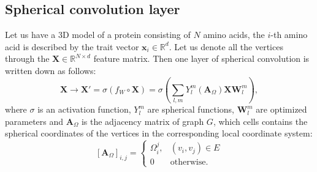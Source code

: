\documentclass[12pt,twoside]{article}
\begin{document}
	\subsection{Spherical convolution layer}
	Let us have a 3D model of a protein consisting of $N$ amino acids, the $i$-th amino acid is described by the trait vector $\boldsymbol{x}_i \in \mathbb{R}^d$.
	Let us denote all the vertices through the $\boldsymbol{X} \in \mathbb{R}^{N \times d}$ feature matrix. Then one layer of spherical
	convolution is written down as follows:
	$$
		\boldsymbol{X} \longrightarrow \boldsymbol{X}' = \sigma(f_W \circ \boldsymbol{X}) = \sigma\left(\sum_{l,m}Y_l^m(\boldsymbol{A}_\Omega)\boldsymbol{X}\boldsymbol{W}_l^m\right),
	$$
	where $\sigma$ is an activation function, $Y_l^m$ are spherical functions, $\boldsymbol{W}_l^m$ are optimized parameters and $\boldsymbol{A}_\Omega$
	is the adjacency matrix of graph $G$, which cells contains the spherical coordinates of the vertices in the corresponding local coordinate system:
	$$
		[\boldsymbol{A}_\Omega]_{i,j} = \begin{cases}
			\Omega_i^j, & (v_i, v_j) \in E \\
			0 & \text{otherwise}.
		\end{cases}
	$$
	
	
	
	
	
	
	
	
	
\end{document}
